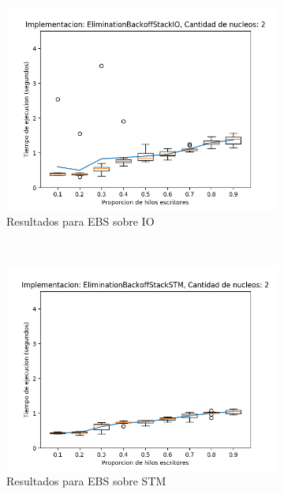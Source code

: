 \begin{figure}[t]
    \centering
    \begin{subfigure}[b]{0.49\textwidth}
        \includegraphics[width=\textwidth]{images/pushPercentages/plots/expEBSIO-2}
        \caption{Resultados para EBS sobre IO}
        \label{subfig:pushPercentages-ebsio-2}
    \end{subfigure}
    ~
    \begin{subfigure}[b]{0.49\textwidth}
        \includegraphics[width=\textwidth]{images/pushPercentages/plots/expEBSSTM-2}
        \caption{Resultados para EBS sobre STM}
        \label{subfig:pushPercentages-ebsstm-2}
    \end{subfigure}
    \begin{subfigure}[b]{0.49\textwidth}

\end{subfigure}
\end{figure}

